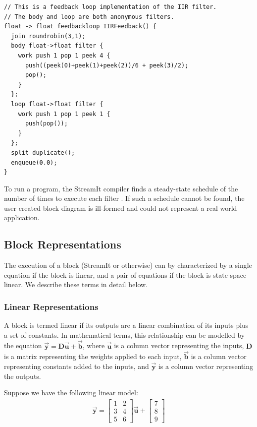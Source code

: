 \begin{scriptsize}
\begin{singlespace}
\begin{verbatim}
// This is a feedback loop implementation of the IIR filter.
// The body and loop are both anonymous filters.
float -> float feedbackloop IIRFeedback() {
  join roundrobin(3,1);
  body float->float filter {
    work push 1 pop 1 peek 4 {
      push((peek(0)+peek(1)+peek(2))/6 + peek(3)/2);
      pop();
    }
  };
  loop float->float filter {
    work push 1 pop 1 peek 1 {
      push(pop());
    }
  };
  split duplicate();
  enqueue(0.0);
}
\end{verbatim}
\end{singlespace}
\end{scriptsize}

    To run a program, the StreamIt compiler finds a
steady-state schedule of the number of times to execute each
filter \cite{Karczmarek}. If such a schedule cannot be found, the
user created block diagram is ill-formed and could not represent a
real world application.

\subsection{Block Representations}

    The execution of a block (StreamIt or otherwise) can by
characterized by a single equation if the block is linear, and a
pair of equations if the block is state-space linear. We describe
these terms in detail below.

\subsubsection{Linear Representations}

    A block is termed linear if its outputs are a linear
combination of its inputs plus a set of constants. In mathematical
terms, this relationship can be modelled by the equation
$\vec{\mathbf{y}} = \mathbf{D}\vec{\mathbf{u}} +
\vec{\mathbf{b}}$, where $\vec{\mathbf{u}}$ is a column vector
representing the inputs, $\mathbf{D}$ is a matrix representing the
weights applied to each input, $\vec{\mathbf{b}}$ is a column
vector representing constants added to the inputs, and
$\vec{\mathbf{y}}$ is a column vector representing the outputs.

    Suppose we have the following linear model:
\begin{eqnarray*}
\vec{\mathbf{y}} = \left [ \begin{array} {cc} 1 & 2 \\ 3 & 4 \\
5 & 6 \end{array} \right ] \vec{\mathbf{u}} + \left [
\begin{array} {c} 7
\\ 8 \\ 9 \end{array}\right ]
\end{eqnarray*}

